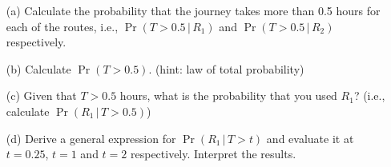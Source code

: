 \begin{itemize}
\item[(a)] Calculate the probability that the journey takes more than 0.5 hours for each of the routes, i.e., $\Pr(T > 0.5\,|\,R_1)$ and $\Pr(T > 0.5\,|\,R_2)$ respectively.  \item[(b)] Calculate $\Pr(T > 0.5)$. (hint: law of total probability)  \item[(c)] Given that $T>0.5$ hours, what is the probability that you used $R_1$? (i.e., calculate $\Pr(R_1\,|\,T>0.5)$)  \item[(d)] Derive a general expression for $\Pr(R_1\,|\,T>t)$ and evaluate it at $t=0.25$, $t = 1$ and $t = 2$ respectively. Interpret the results.
\end{itemize}

